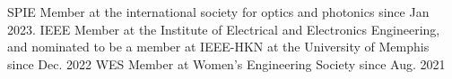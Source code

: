 


\begin{cvskills}

  \cvskill
  {SPIE}
  {Member at the international society for optics and photonics since Jan 2023.}
  \cvskill
    {IEEE}
    {Member at the Institute of Electrical and Electronics Engineering, and nominated to be a member at IEEE-HKN at the University of Memphis since Dec. 2022}
  \cvskill
    {WES} %
    {Member at Women's Engineering Society since Aug. 2021} %
\end{cvskills}